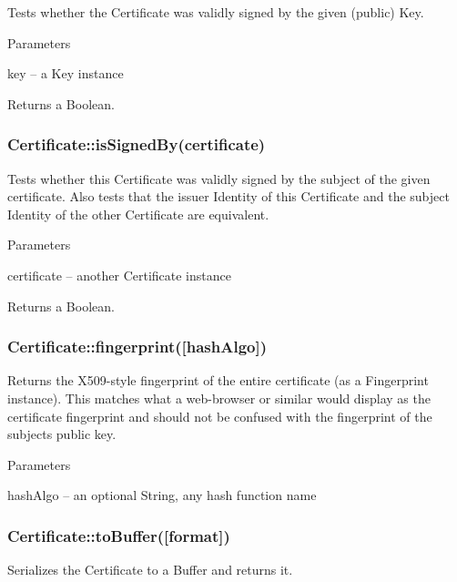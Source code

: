 Tests whether the Certificate was validly signed by the given (public) Key.

Parameters


\begin{DoxyItemize}
\item {\ttfamily key} -- a Key instance
\end{DoxyItemize}

Returns a Boolean.

\subsubsection*{{\ttfamily Certificate\+::is\+Signed\+By(certificate)}}

Tests whether this Certificate was validly signed by the subject of the given certificate. Also tests that the issuer Identity of this Certificate and the subject Identity of the other Certificate are equivalent.

Parameters


\begin{DoxyItemize}
\item {\ttfamily certificate} -- another Certificate instance
\end{DoxyItemize}

Returns a Boolean.

\subsubsection*{{\ttfamily Certificate\+::fingerprint(\mbox{[}hash\+Algo\mbox{]})}}

Returns the X509-\/style fingerprint of the entire certificate (as a Fingerprint instance). This matches what a web-\/browser or similar would display as the certificate fingerprint and should not be confused with the fingerprint of the subject\textquotesingle{}s public key.

Parameters


\begin{DoxyItemize}
\item {\ttfamily hash\+Algo} -- an optional String, any hash function name
\end{DoxyItemize}

\subsubsection*{{\ttfamily Certificate\+::to\+Buffer(\mbox{[}format\mbox{]})}}

Serializes the Certificate to a Buffer and returns it.

